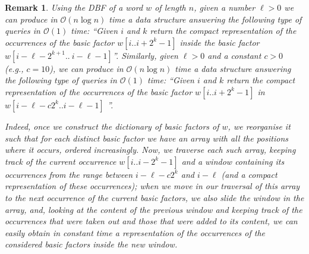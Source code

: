 \documentclass[final]{dmtcs-episciences}
\newcommand{\bigo}{{\mathcal O}}
\newtheorem{remark}{Remark}
\begin{document}
\begin{remark}\label{rem_DBF}
Using the DBF of a word $w$ of length $n$, given a number $\ell>0$ we can produce in $\bigo(n\log n)$ time a data structure answering the following type of queries in $\bigo(1)$ time: ``Given $i$ and $k$ return the compact representation of the occurrences of the basic factor $w[i..i+2^k-1]$ inside the basic factor $w[i-\ell-2^{k+1}..\ i-\ell-1]$''. Similarly, given $\ell>0$ and a constant $c>0$ (e.g., $c=10$), we can produce in $\bigo(n\log n)$ time a data structure answering the following type of queries in $\bigo(1)$ time: ``Given $i$ and $k$ return the compact representation of the occurrences of the basic factor $w[i..i+2^k-1]$ in $w[i-\ell-c2^{k}..i-\ell-1]$ ''. 

Indeed, once we construct the dictionary of basic factors of $w$, we reorganise it such that for each distinct basic factor we have an array with all the positions where it occurs, ordered increasingly. Now, we traverse each such array, keeping track of the current occurrence $w[i..i-2^k-1]$ and a window containing its occurrences from the range between $i-\ell-c 2^{k}$ and $i-\ell$ (and a compact representation of these occurrences); when we move in our traversal of this array to the next occurrence of the current basic factors, we also slide the window in the array, and, looking at the content of the previous window and keeping track of the occurrences that were taken out and those that were added to its content, we can easily obtain in constant time a representation of the occurrences of the considered basic factors inside the new window. 
\end{remark}
\end{document}
